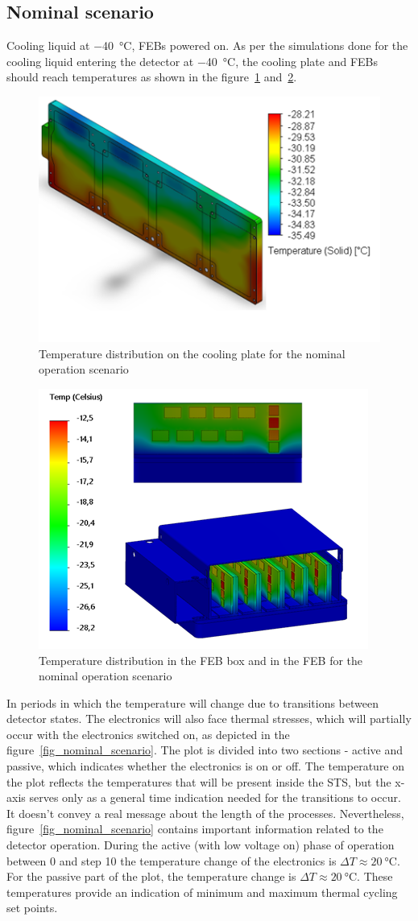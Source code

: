 \subsection{Nominal scenario}
Cooling liquid at \SI{-40}{\celsius}, \gls{FEB}s powered on.
    As per the simulations done for the cooling liquid entering the detector at  \SI{-40}{\celsius}, the cooling plate and \gls{FEB}s should reach temperatures as shown in the figure~\ref{fig_coolinkg_block_nominal} and~\ref{fig_nominal_febs}.
\begin{figure}[!h]
\centering
\includegraphics[width=0.5\columnwidth]{Chapter3/Cycling/Images/cooling_block_nominal.png}
\caption{Temperature distribution on the cooling plate for the nominal operation scenario}
\label{fig_coolinkg_block_nominal}
\end{figure}
\begin{figure}[!h]
\centering
\includegraphics[width=0.5\columnwidth]{Chapter3/Cycling/Images/nominal_febs.png}
\caption{Temperature distribution in the \gls{FEB} box and in the \gls{FEB} for the nominal operation scenario}
\label{fig_nominal_febs}
\end{figure}
In periods in which the temperature will change due to transitions between detector states. The electronics will also face thermal stresses, which will partially occur with the electronics switched on, as depicted in the figure~\ref{fig_nominal_scenario}. The plot is divided into two sections - active and passive, which indicates whether the electronics is on or off. The temperature on the plot reflects the temperatures that will be present inside the \gls{STS}, but the x-axis serves only as a general time indication needed for the transitions to occur. It doesn't convey a real message about the length of the processes. Nevertheless, figure~\ref{fig_nominal_scenario} contains important information related to the detector operation. During the active (with low voltage on) phase of operation between 0 and step 10 the temperature change of the electronics is $\Delta T \approx \SI{20}{\celsius}$. For the passive part of the plot, the temperature change is $\Delta T \approx \SI{20}{\celsius}$. These temperatures provide an indication of minimum and maximum thermal cycling set points.  
